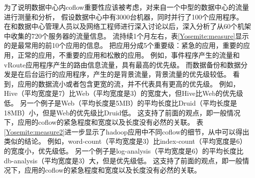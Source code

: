  
为了说明数据中心内coflow重要性应该被考虑，对来自一个中型的数据中心的流量进行测量和分析，
假设数据中心中有3000台机器，同时并行了100个应用程序。
在和数据中心管理人员以及网络工程师进行深入讨论以后，深入分析了从60个机架中收集的720个服务器的流量信息。
流持续1个月左右，表\ref{Yosemite:measure}显示的是最常用的前10个应用的信息。
把应用分成5个重要级：紧急的应用，重要的应用，正常的应用，不重要的应用和松散的应用。
例如，事件程序产生的流量和vRoute应用程序产生的路由信息流量，具有最高的优先级。
而数据备份和数据分发是在后台运行的应用程序，产生的是背景流量，背景流量的优先级较低。
看到，应用的数据流小或者包含更宽的流，并不代表具有更高的优先级。
例如，Hive（平均宽度是7）比Web（平均宽度是3）的宽度大，但Hive比Web的优先级低。
另一个例子是Web（平均长度是5MB）的平均长度比Druid（平均长度是18MB）小，但是Web的优先级比Druid低。
这支持了前面的观点，即一般情况下，应用的coflow的紧急程度和宽度以及长度没有必然的关联。
表\ref{Yosemite:measure2}进一步显示了hadoop应用中不同coflow的细节，从中可以得出类似的结论。
例如，word-count（平均宽度是3）比index-count（平均宽度是6）的宽度小，优先级低。
另一个例子是log-analysis（平均宽度是6）的平均长度比db-analysis（平均宽度是3）大，但是优先级低。
这支持了前面的观点，即一般情况下，应用的coflow的紧急程度和宽度以及长度没有必然的关联。
